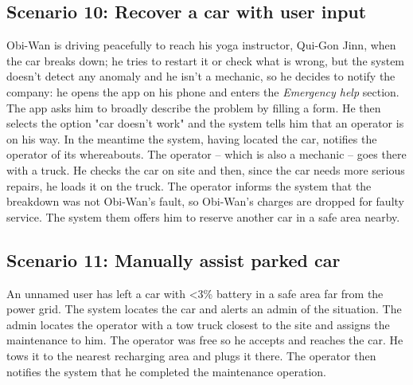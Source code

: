 \subsection{Scenario 10: Recover a car with user input}
	Obi-Wan is driving peacefully to reach his yoga instructor, Qui-Gon Jinn, when the car breaks down; he tries to restart it or check what is wrong, but the system doesn't detect any anomaly and he isn't a mechanic, so he decides to notify the company: he opens the app on his phone and enters the \textit{Emergency help} section. The app asks him to broadly describe the problem by filling a form. He then selects the option "car doesn't work" and the system tells him that an operator is on his way. In the meantime the system, having located the car, notifies the operator of its whereabouts. The operator – which is also a mechanic – goes there with a truck. He checks the car on site and then, since the car needs more serious repairs, he loads it on the truck. The operator informs the system that the breakdown was not Obi-Wan's fault, so Obi-Wan's charges are dropped for faulty service. The system them offers him to reserve another car in a safe area nearby. %
	
\subsection{Scenario 11: Manually assist parked car}
	An unnamed user has left a car with <3\% battery in a safe area far from the power grid. The system locates the car and alerts an admin of the situation. The admin locates the operator with a tow truck closest to the site and assigns the maintenance to him. The operator was free so he accepts and reaches the car. He tows it to the nearest recharging area and plugs it there. The operator then notifies the system that he completed the maintenance operation.